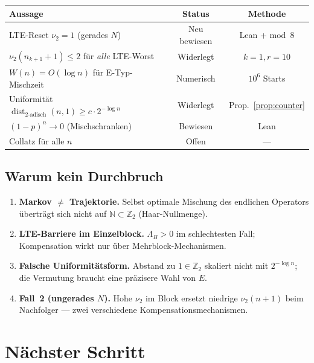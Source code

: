 \documentclass[12pt,a4paper]{article}
\newcommand{\vii}{\nu_2}
\newcommand{\N}{\mathbb{N}}
\newcommand{\Ztwo}{\mathbb{Z}_2}
\newcommand{\Lam}{\Lambda}
\newcommand{\disttwo}{\operatorname{dist}_{2\text{-adisch}}}
\begin{document}
\begin{center}
\renewcommand{\arraystretch}{1.35}
\begin{tabular}{>{\raggedright}p{6.2cm}cc}
\toprule
\textbf{Aussage} & \textbf{Status} & \textbf{Methode} \\
\midrule
LTE-Reset $\vii=1$ (gerades $N$) & \textcolor{bewiesengruen}{Neu bewiesen} & Lean + mod~8 \\
$\vii(n_{k+1}+1)\leq 2$ für \emph{alle} LTE-Worst & \textcolor{lueckenrot}{Widerlegt} & $k{=}1,r{=}10$ \\
$W(n)=O(\log n)$ für E-Typ-Mischzeit & \textcolor{warnorange}{Numerisch} & $10^6$ Starts \\
Uniformität $\disttwo(n,1)\geq c\cdot 2^{-\log n}$ & \textcolor{lueckenrot}{Widerlegt} & Prop.~\ref{prop:counter} \\
$(1-p)^n\to 0$ (Mischschranken) & \textcolor{bewiesengruen}{Bewiesen} & Lean \\
Collatz für alle $n$ & \textcolor{lueckenrot}{Offen} & --- \\
\bottomrule
\end{tabular}
\end{center}

\subsection{Warum kein Durchbruch}

\begin{enumerate}[label=(\arabic*)]
  \item \textbf{Markov $\neq$ Trajektorie.} Selbst optimale Mischung des
    endlichen Operators überträgt sich nicht auf $\N\subset\Ztwo$
    (Haar-Nullmenge).
  \item \textbf{LTE-Barriere im Einzelblock.} $\Lam_B>0$ im schlechtesten
    Fall; Kompensation wirkt nur über Mehrblock-Mechanismen.
  \item \textbf{Falsche Uniformitätsform.} Abstand zu $1\in\Ztwo$ skaliert
    nicht mit $2^{-\log n}$; die Vermutung braucht eine präzisere Wahl von $E$.
  \item \textbf{Fall~2 (ungerades $N$).} Hohe $\vii$ im Block ersetzt
    niedrige $\vii(n+1)$ beim Nachfolger --- zwei verschiedene
    Kompensationsmechanismen.
\end{enumerate}

\section{Nächster Schritt}
\label{sec:nächster}
\end{document}
